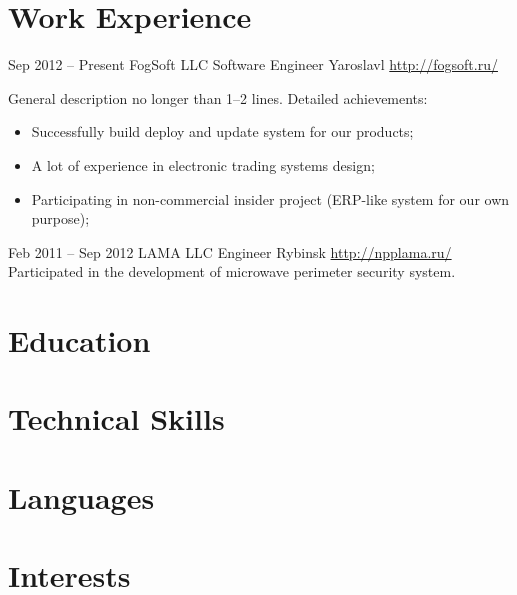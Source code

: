 \documentclass[11pt,a4paper,sans]{moderncv}
\begin{document}
    \makecvtitle
    
    \section{Work Experience}
    \cventry
      {Sep 2012 -- Present}
      {FogSoft LLC}
      {Software Engineer}
      {Yaroslavl}
      {\newline{}\url{http://fogsoft.ru/}}
      {General description no longer than 1--2 lines.\newline{}%
    Detailed achievements:%
    \begin{itemize}%
    \item Successfully build deploy and update system for our products;
    \item A lot of experience in electronic trading systems design;
    \item Participating in non-commercial insider project (ERP-like system for our own purpose);
    \end{itemize}}
    \cventry
      {Feb 2011 -- Sep 2012}
      {LAMA LLC}
      {Engineer}
      {Rybinsk}
      {\newline{}\url{http://npplama.ru/}}
      {Participated in the development of microwave perimeter security system.}
      
    \section{Education}
    
    \section{Technical Skills}
    
    \section{Languages}
    
    \section{Interests}
    
\end{document}
